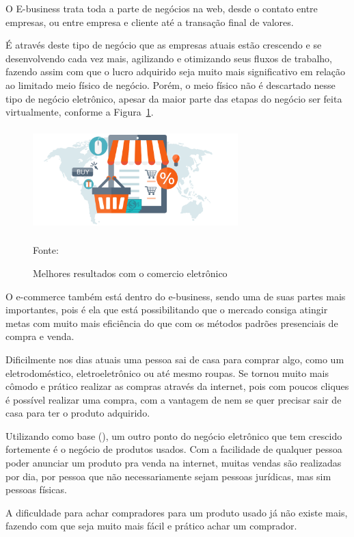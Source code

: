 O E-business trata toda a parte de negócios na web, desde o contato entre empresas, ou entre empresa e cliente até a transação final de valores.

\newpage
É através deste tipo de negócio que as empresas atuais estão crescendo e se desenvolvendo cada vez mais, agilizando e otimizando seus fluxos de trabalho, fazendo assim com que o lucro adquirido seja muito mais significativo em relação ao limitado meio físico de negócio. Porém, o meio físico não é descartado nesse tipo de negócio eletrônico, apesar da maior parte das etapas do negócio ser feita virtualmente, conforme a Figura~\hypersetup{linkcolor=black}\ref{fig:Melhores}.

 \begin{figure}[!h]
	\centering
	\caption{Melhores resultados com o comercio eletrônico}
	\label{fig:Melhores}
	\includegraphics[width=300px, height=150px]{./images/2-6.png}
	\par{Fonte: \cite{3webbox}}
\end{figure}

O e-commerce também está dentro do e-business, sendo uma de suas partes mais importantes, pois é ela que está possibilitando que o mercado consiga atingir metas com muito mais eficiência do que com os métodos padrões presenciais de compra e venda.

Dificilmente nos dias atuais uma pessoa sai de casa para comprar algo, como um eletrodoméstico, eletroeletrônico ou até mesmo roupas. Se tornou muito mais cômodo e prático realizar as compras através da internet, pois com poucos cliques é possível realizar uma compra, com a vantagem de nem se quer precisar sair de casa para ter o produto adquirido.

Utilizando como base (\cite{e-business}), um outro ponto do negócio eletrônico que tem crescido fortemente é o negócio de produtos usados. Com a facilidade de qualquer pessoa poder anunciar um produto pra venda na internet, muitas vendas são realizadas por dia, por pessoa que não necessariamente sejam pessoas jurídicas, mas sim pessoas físicas.

A dificuldade para achar compradores para um produto usado já não existe mais, fazendo com que seja muito mais fácil e prático achar um comprador.

